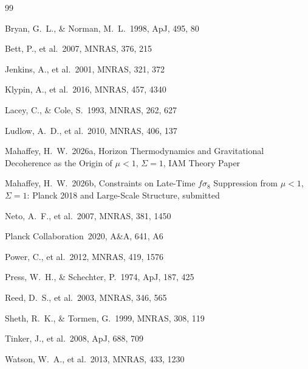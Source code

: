 \documentclass[12pt,a4paper]{article}
\begin{document}

\begin{thebibliography}{99}

  Bryan, G.~L., \& Norman, M.~L.\ 1998, ApJ, 495, 80

  Bett, P., et al.\ 2007, MNRAS, 376, 215

  Jenkins, A., et al.\ 2001, MNRAS, 321, 372

  Klypin, A., et al.\ 2016, MNRAS, 457, 4340

  Lacey, C., \& Cole, S.\ 1993, MNRAS, 262, 627

  Ludlow, A.~D., et al.\ 2010, MNRAS, 406, 137

  Mahaffey, H.~W.\ 2026a, Horizon Thermodynamics and Gravitational
  Decoherence as the Origin of $\mu < 1$, $\Sigma = 1$, IAM Theory Paper

  Mahaffey, H.~W.\ 2026b, Constraints on Late-Time $f\sigma_8$
  Suppression from $\mu < 1$, $\Sigma = 1$: Planck 2018 and
  Large-Scale Structure, submitted

  Neto, A.~F., et al.\ 2007, MNRAS, 381, 1450

  Planck Collaboration\ 2020, A\&A, 641, A6

  Power, C., et al.\ 2012, MNRAS, 419, 1576

  Press, W.~H., \& Schechter, P.\ 1974, ApJ, 187, 425

  Reed, D.~S., et al.\ 2003, MNRAS, 346, 565

  Sheth, R.~K., \& Tormen, G.\ 1999, MNRAS, 308, 119

  Tinker, J., et al.\ 2008, ApJ, 688, 709

  Watson, W.~A., et al.\ 2013, MNRAS, 433, 1230

\end{thebibliography}
\end{document}
